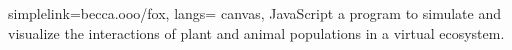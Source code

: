 \documentclass{article}
\begin{document}
\begin{softwarelist}

\begin{software}{simplelink=becca.ooo/fox,
		langs={ canvas, JavaScript}}
	a program to simulate and visualize the interactions of plant and
	animal populations in a virtual ecosystem.
\end{software}



\end{softwarelist}






\end{document}
